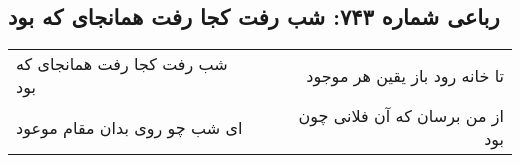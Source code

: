\begin{center}
\section*{رباعی شماره ۷۴۳: شب رفت کجا رفت همانجای که بود}
\label{sec:0743}
\begin{longtable}{l p{0.5cm} r}
شب رفت کجا رفت همانجای که بود
&&
تا خانه رود باز یقین هر موجود
\\
ای شب چو روی بدان مقام موعود
&&
از من برسان که آن فلانی چون بود
\\
\end{longtable}
\end{center}
